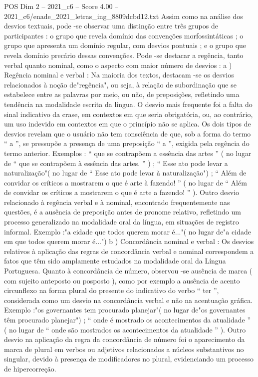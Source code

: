 \begin{textsample}{POS Dim 2 – 2021\_c6 – Score 4.00 – 2021\_c6/enade\_2021\_letras\_ing\_8809dcbd12.txt}
Assim como na análise dos desvios textuais, pode -se observar uma distinção entre três grupos de participantes : o grupo que revela domínio das convenções morfossintáticas ; o grupo que apresenta um domínio regular, com desvios pontuais ; e o grupo que revela domínio precário dessas convenções.
Pode -se destacar a regência, tanto verbal quanto nominal, como o aspecto com maior número de desvios : a ) Regência nominal e verbal : Na maioria dos textos, destacam -se os desvios relacionados à noção de"regência", ou seja, à relação de subordinação que se estabelece entre as palavras por meio, ou não, de preposições, refletindo uma tendência na modalidade escrita da língua.
O desvio mais frequente foi a falta do sinal indicativo da crase, em contextos em que seria obrigatória, ou, ao contrário, um uso indevido em contextos em que o princípio não se aplica.
Os dois tipos de desvios revelam que o usuário não tem consciência de que, sob a forma do termo “ a ”, se pressupõe a presença de uma preposição “ a ”, exigida pela regência do termo anterior.
Exemplos : “ que se contrapõem a essência das artes ” ( no lugar de “ que se contrapõem à essência das artes. ” ) ; “ Esse ato pode levar a naturalização"( no lugar de “ Esse ato pode levar à naturalização") ; “ Além de convidar os críticos a mostrarem o que é arte à fazendo! ” ( no lugar de “ Além de convidar os críticos a mostrarem o que é arte a fazendo! ” ).
Outro desvio relacionado à regência verbal e à nominal, encontrado frequentemente nas questões, é a ausência de preposição antes de pronome relativo, refletindo um processo generalizado na modalidade oral da língua, em situações de registro informal.
Exemplo :"a cidade que todos querem morar é..."( no lugar de"a cidade em que todos querem morar é...") b ) Concordância nominal e verbal : Os desvios relativos à aplicação das regras de concordância verbal e nominal correspondem a fatos que têm sido amplamente estudados na modalidade oral da Língua Portuguesa.
Quanto à concordância de número, observou -se ausência de marca ( com sujeito anteposto ou posposto ), como por exemplo a ausência de acento circunflexo na forma plural do presente do indicativo do verbo “ ter ”, considerada como um desvio na concordância verbal e não na acentuação gráfica.
Exemplo :"os governantes tem procurado planejar"( no lugar de"os governantes têm procurado planejar") ; “ onde é mostrado os acontecimentos da atualidade ” ( no lugar de “ onde são mostrados os acontecimentos da atualidade ” ).
Outro desvio na aplicação da regra da concordância de número foi o aparecimento da marca de plural em verbos ou adjetivos relacionados a núcleos substantivos no singular, devido à presença de modificadores no plural, evidenciando um processo de hipercorreção.

\end{textsample}
